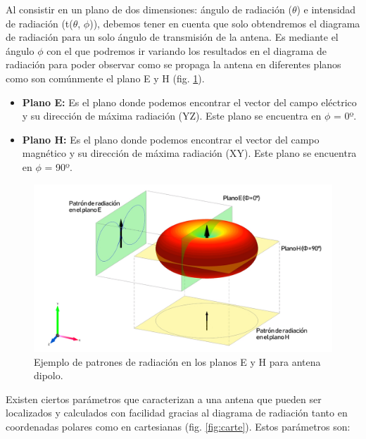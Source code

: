 \par Al consistir en un plano de dos dimensiones: ángulo de radiación ($\theta$) e intensidad de radiación (t($\theta $, $\phi $)), debemos tener en cuenta que solo obtendremos el diagrama de radiación para un solo ángulo de transmisión de la antena. Es mediante el ángulo $\phi $ con el que podremos ir variando los resultados en el diagrama de radiación para poder observar como se propaga la antena en diferentes planos como son comúnmente el plano E y H (fig. \ref{fig:pattern}).

\begin{itemize}
\item \textbf{Plano E: }Es el plano donde podemos encontrar el vector del campo eléctrico y su dirección de máxima radiación (YZ). Este plano se encuentra en $\phi $ = 0º. 

\item \textbf{Plano H: }Es el plano donde podemos encontrar el vector del campo magnético y su dirección de máxima radiación (XY). Este plano se encuentra en $\phi $ = 90º.
\end{itemize}

\begin{figure}[h]
    \centering
        \includegraphics[width=15cm]{archivos/radiacion/pattern2}
        \caption{Ejemplo de patrones de radiación en los planos E y H para antena dipolo. \cite{Yavuz2015}}
        \label{fig:pattern}
\end{figure}

\par Existen ciertos parámetros que caracterizan a una antena que pueden ser localizados y calculados con facilidad gracias al diagrama de radiación tanto en coordenadas polares como en cartesianas (fig. \ref{fig:carte}). Estos parámetros son:

